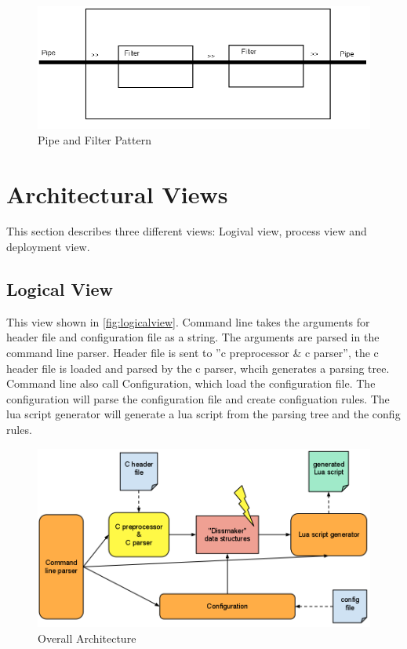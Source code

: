 \begin{figure}[htb]
	\includegraphics[width=\textwidth]{./planning/img/PipeAndFilter}
	\caption{Pipe and Filter Pattern\label{fig:pipefilter}}
\end{figure}


\section{Architectural Views}
This section describes three different views: Logival view, process view and deployment view.

\subsection{Logical View}
This view shown in \autoref{fig:logicalview}. Command line takes the arguments for \gls{header} file and configuration file as a string. The arguments are parsed in the command line \gls{parser}. Header file is sent to ''\Gls{c} \gls{preprocessor} \& \Gls{c} \gls{parser}'', the \Gls{c} \gls{header} file is loaded and parsed by the \Gls{c} \gls{parser}, whcih generates a parsing tree. Command line also call Configuration, which load the configuration file. The configuration will parse the configuration file and create configuation rules. The \Gls{lua} \gls{script} generator will generate a \Gls{lua} \gls{script} from the parsing tree and the config rules.

\begin{figure}[htb]
	\includegraphics[width=\textwidth]{./planning/img/overall_design}
	\caption{Overall Architecture\label{fig:logicalview}}
\end{figure}


